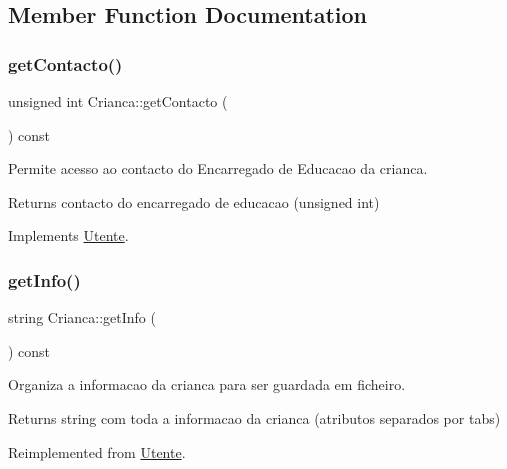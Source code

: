 \subsection{Member Function Documentation}
\mbox{\label{class_crianca_a528589e1353aa4eb4348e9e1d67b6a47}} 
\subsubsection{\texorpdfstring{get\+Contacto()}{getContacto()}}
{\footnotesize\ttfamily unsigned int Crianca\+::get\+Contacto (\begin{DoxyParamCaption}{ }\end{DoxyParamCaption}) const\hspace{0.3cm}{\ttfamily [virtual]}}



Permite acesso ao contacto do Encarregado de Educacao da crianca. 

\begin{DoxyReturn}{Returns}
contacto do encarregado de educacao (unsigned int) 
\end{DoxyReturn}


Implements \mbox{\hyperlink{class_utente}{Utente}}.

\mbox{\label{class_crianca_a7cd065415f6f0a2802ca2d37a3a7cc25}} 
\subsubsection{\texorpdfstring{get\+Info()}{getInfo()}}
{\footnotesize\ttfamily string Crianca\+::get\+Info (\begin{DoxyParamCaption}{ }\end{DoxyParamCaption}) const\hspace{0.3cm}{\ttfamily [virtual]}}



Organiza a informacao da crianca para ser guardada em ficheiro. 

\begin{DoxyReturn}{Returns}
string com toda a informacao da crianca (atributos separados por tabs) 
\end{DoxyReturn}


Reimplemented from \mbox{\hyperlink{class_utente_aee03eae2a7154e7b4713b2be195d548f}{Utente}}.

